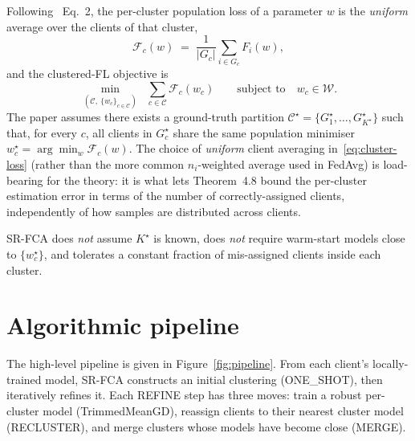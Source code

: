 Following~\parencite{vardhan2024srfca} Eq.~2, the per-cluster population loss of a parameter $w$ is the \emph{uniform} average over the clients of that cluster,
\begin{equation}\label{eq:cluster-loss}
    \mathcal{F}_c(w) \;=\; \frac{1}{|G_c|} \sum_{i \in G_c} F_i(w),
\end{equation}
and the clustered-FL objective is
\begin{equation}\label{eq:objective}
    \min_{(\mathcal{C},\ \{w_c\}_{c \in \mathcal{C}})} \;\; \sum_{c \in \mathcal{C}} \mathcal{F}_c(w_c)
    \qquad\text{subject to}\quad w_c \in \mathcal{W}.
\end{equation}
The paper assumes there exists a ground-truth partition $\mathcal{C}^\star = \{G_1^\star,\dots,G_{K^\star}^\star\}$ such that, for every $c$, all clients in $G_c^\star$ share the same population minimiser $w_c^\star = \arg\min_w \mathcal{F}_c(w)$. The choice of \emph{uniform} client averaging in~\eqref{eq:cluster-loss} (rather than the more common $n_i$-weighted average used in FedAvg) is load-bearing for the theory: it is what lets Theorem~4.8 bound the per-cluster estimation error in terms of the number of correctly-assigned clients, independently of how samples are distributed across clients.

SR-FCA does \emph{not} assume $K^\star$ is known, does \emph{not} require warm-start models close to $\{w_c^\star\}$, and tolerates a constant fraction of mis-assigned clients inside each cluster.

\section{Algorithmic pipeline}\label{sec:pipeline}

The high-level pipeline is given in Figure~\ref{fig:pipeline}. From each client's locally-trained model, SR-FCA constructs an initial clustering (ONE\_SHOT), then iteratively refines it. Each REFINE step has three moves: train a robust per-cluster model (TrimmedMeanGD), reassign clients to their nearest cluster model (RECLUSTER), and merge clusters whose models have become close (MERGE).

